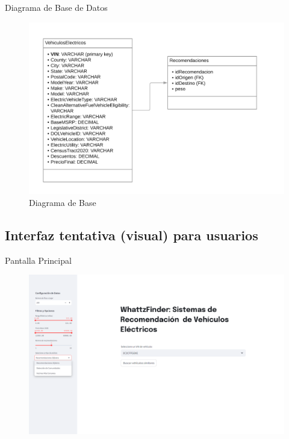 \documentclass[12pt]{article}
\begin{document}
Diagrama de Base de Datos
\begin{figure}[htbp]
    \centering
    \includegraphics[width=\textwidth]{./imgs-latex/diagramadebase.png}
    \caption{Diagrama de Base}
    \label{fig:diagramadebase}
\end{figure}



\subsection{Interfaz tentativa (visual) para usuarios}

Pantalla Principal
\begin{figure}[htbp]
    \centering
    \includegraphics[width=\textwidth]{./imgs-latex/img1.png}\label{fig:img1}
\end{figure}
\end{document}
